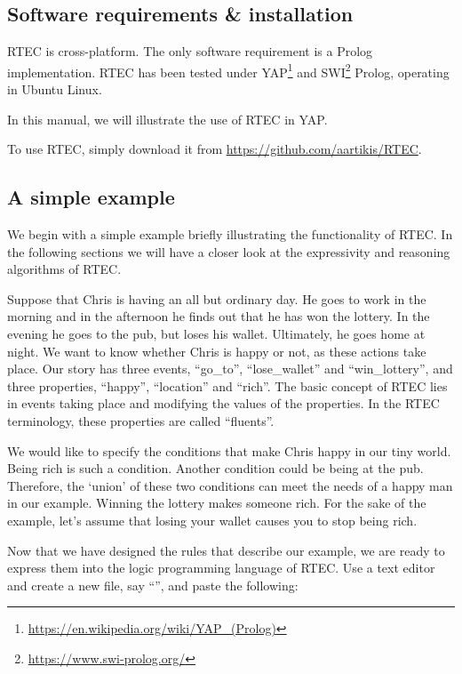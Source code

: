 \subsection{Software requirements \& installation}

RTEC is cross-platform. The only software requirement is a Prolog implementation. RTEC has been tested under YAP\footnote{\url{https://en.wikipedia.org/wiki/YAP_(Prolog)}} and SWI\footnote{\url{https://www.swi-prolog.org/}} Prolog, operating in Ubuntu Linux. 

In this manual, we will illustrate the use of RTEC in YAP.

To use RTEC, simply download it from \url{https://github.com/aartikis/RTEC}.





\subsection{A simple example}\label{sec:aSimpleExample}  

We begin with a simple example briefly illustrating  the functionality of RTEC. In the following sections we will have a closer look at the expressivity and reasoning algorithms of RTEC.

Suppose that Chris is having an all but ordinary day. He goes to work in the morning and in the afternoon he finds out that he has won the lottery. In the evening he goes to the pub, but loses his wallet. Ultimately, he goes home at night. We want to know whether Chris is happy or not, as these actions take place. Our story has three events, ``go\_to'', ``lose\_wallet'' and ``win\_lottery'', and three properties, ``happy'', ``location'' and ``rich''. The basic concept of RTEC lies in events taking place and modifying the values of the properties. In the RTEC terminology, these properties are called ``fluents''.

We would like to specify the conditions that make Chris happy in our tiny world. Being rich is such a condition. Another condition could be being at the pub. Therefore, the `union' of these two conditions can meet the needs of a happy man in our example. Winning the lottery makes someone rich. For the sake of the example, let's assume that losing your wallet causes you to stop being rich. 

Now that we have designed the rules that describe our example, we are ready to express them into the logic programming language of RTEC. Use a text editor and create a new file, say  ``'', and paste the following:

